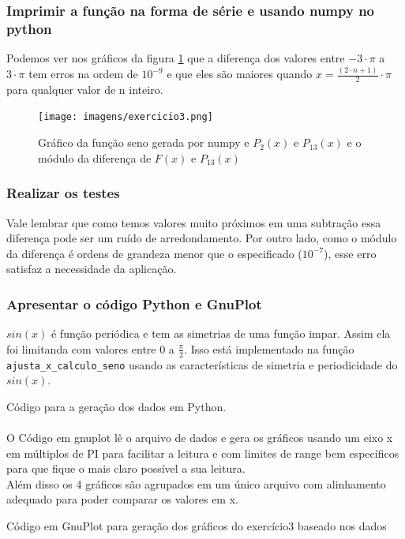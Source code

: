 \subsubsection{Imprimir a função na forma de série e usando numpy no python}

Podemos ver nos gráficos da figura \ref{fig:grafico_exe3} que a diferença dos valores entre $-3 \cdot \pi$ a $3 \cdot \pi$ tem erros na ordem de $10^{-9}$ e que eles são maiores quando $ x = \frac{(2 \cdot n + 1)}{2} \cdot \pi $ para qualquer valor de n inteiro.
\begin{figure}[H]
    \centering
    \texttt{[image: imagens/exercicio3.png]}
    \caption{Gráfico da função seno gerada por numpy e $P_2(x)$ e $P_{13}(x)$ e o módulo da diferença de $F(x)$ e $P_{13}(x)$}
    \label{fig:grafico_exe3}
\end{figure}


\subsubsection{Realizar os testes}



Vale lembrar que como temos valores muito próximos em uma subtração essa diferença pode ser um ruído de arredondamento.
Por outro lado, como o módulo da diferença é ordens de grandeza menor que o especificado ($10^{-7}$), esse erro satisfaz a necessidade da aplicação.\\

\subsubsection{Apresentar o código Python e GnuPlot}
\label{sec:caracteristicas-funcao-sin}
$sin(x)$ é função periódica e tem as simetrias de uma função impar. Assim ela foi limitanda com valores entre $0$ a $\frac{\pi}{2}$.
Isso está implementado na função \texttt{ajusta\_x\_calculo\_seno} usando as características de simetria e periodicidade do $sin(x)$.


Código para a geração dos dados em Python.\\
\\
O Código em gnuplot lê o arquivo de dados e gera os gráficos usando um eixo x em múltiplos de PI para facilitar a leitura e com limites de range bem específicos para que fique o mais claro possível a sua leitura.\\
Além disso os 4 gráficos são agrupados em um único arquivo com alinhamento adequado para poder comparar os valores em x.

Código em GnuPlot para geração dos gráficos do exercício3 baseado nos dados